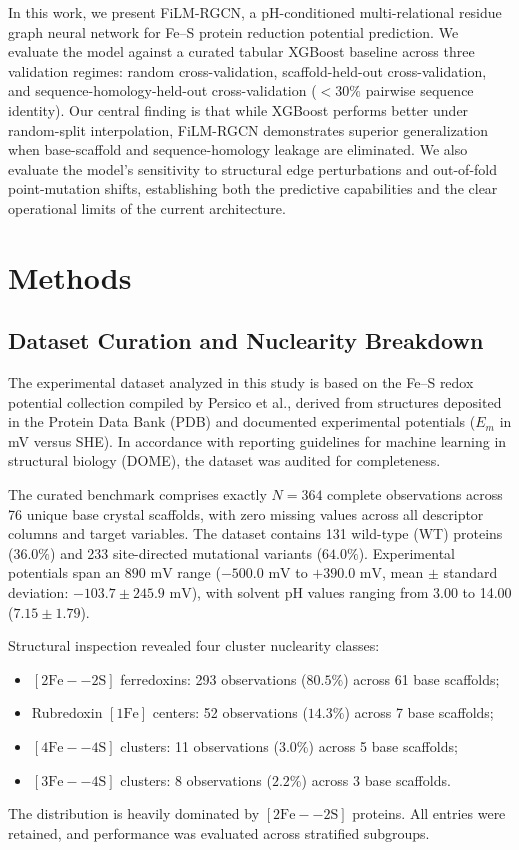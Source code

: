 \documentclass[journal=jcisd8,manuscript=article]{achemso}
\begin{document}
In this work, we present FiLM-RGCN, a pH-conditioned multi-relational residue graph neural network for Fe--S protein reduction potential prediction. We evaluate the model against a curated tabular XGBoost baseline across three validation regimes: random cross-validation, scaffold-held-out cross-validation, and sequence-homology-held-out cross-validation ($<30\%$ pairwise sequence identity). Our central finding is that while XGBoost performs better under random-split interpolation, FiLM-RGCN demonstrates superior generalization when base-scaffold and sequence-homology leakage are eliminated. We also evaluate the model's sensitivity to structural edge perturbations and out-of-fold point-mutation shifts, establishing both the predictive capabilities and the clear operational limits of the current architecture.

\section{Methods}

\subsection{Dataset Curation and Nuclearity Breakdown}
The experimental dataset analyzed in this study is based on the Fe--S redox potential collection compiled by Persico et al.,\cite{persico2025predicting} derived from structures deposited in the Protein Data Bank (PDB)\cite{berman2000protein} and documented experimental potentials ($E_m$ in mV versus SHE). In accordance with reporting guidelines for machine learning in structural biology (DOME),\cite{walsh2021dome} the dataset was audited for completeness. 

The curated benchmark comprises exactly $N = 364$ complete observations across 76 unique base crystal scaffolds, with zero missing values across all descriptor columns and target variables. The dataset contains 131 wild-type (WT) proteins ($36.0\%$) and 233 site-directed mutational variants ($64.0\%$). Experimental potentials span an $890\text{ mV}$ range ($-500.0\text{ mV}$ to $+390.0\text{ mV}$, mean $\pm$ standard deviation: $-103.7 \pm 245.9\text{ mV}$), with solvent pH values ranging from 3.00 to 14.00 ($7.15 \pm 1.79$). 

Structural inspection revealed four cluster nuclearity classes:
\begin{itemize}
    \item $[2\text{Fe}--2\text{S}]$ ferredoxins: 293 observations ($80.5\%$) across 61 base scaffolds;
    \item Rubredoxin $[1\text{Fe}]$ centers: 52 observations ($14.3\%$) across 7 base scaffolds;
    \item $[4\text{Fe}--4\text{S}]$ clusters: 11 observations ($3.0\%$) across 5 base scaffolds;
    \item $[3\text{Fe}--4\text{S}]$ clusters: 8 observations ($2.2\%$) across 3 base scaffolds.
\end{itemize}
The distribution is heavily dominated by $[2\text{Fe}--2\text{S}]$ proteins. All entries were retained, and performance was evaluated across stratified subgroups.
\end{document}
